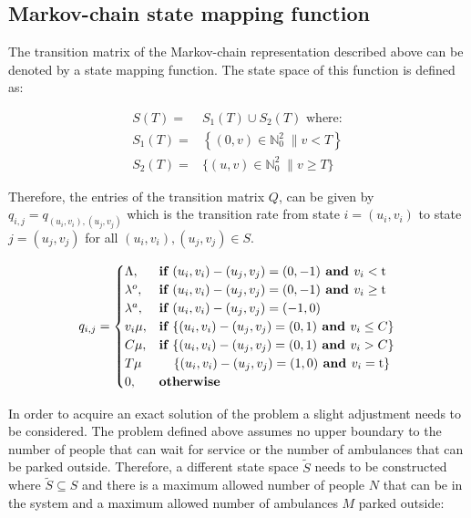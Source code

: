 \documentclass{article}
\begin{document}
\subsection{Markov-chain state mapping function}
The transition matrix of the Markov-chain representation described above can be denoted by a state mapping function. The state space of this function is defined as:



\begin{align}
    S(T) =& S_1(T) \cup S_2(T) \text{ where:} \nonumber \\
    S_1(T) =& \left\{(0, v)\in\mathbb{N}_0^2 \; \| v < T \right\} \\
    S_2(T) =& \{(u, v)\in\mathbb{N}_0^2 \; \| v \geq T \} \nonumber
\end{align}

Therefore, the entries of the transition matrix $Q$, can be given by $q_{i,j} = q_{(u_i, v_i),(u_j, v_j)}$ which is the transition rate from state $i = (u_i, v_i)$ to state $j = (u_j , v_j)$ for all $(u_i, v_i), (u_j, v_j) \in S$.

\begin{equation}
    q_{i, j} = 
    \begin{cases}
        \Lambda, & \textbf{if } (u_i,v_i) - (u_j, v_j) = (0,-1) \textbf{ and } v_i < \text{t} \\
        \lambda^o, & \textbf{if } (u_i,v_i) - (u_j, v_j) = (0,-1) \textbf{ and } v_i \geq \text{t} \\
        \lambda^a, & \textbf{if } (u_i,v_i) - (u_j, v_j) = (-1,0) \\
        v_i \mu, & \textbf{if } \{ (u_i,v_i) - (u_j, v_j) = (0,1) \textbf{ and } v_i \leq C\}\\
        C \mu, & \textbf{if } \{ (u_i,v_i) - (u_j, v_j) = (0,1) \textbf{ and } v_i > C\} \\
        T \mu & \hspace{0.4cm} \{(u_i,v_i) - (u_j, v_j) = (1,0) \textbf{ and } v_i = \text{t}\} \\
        0, & \textbf{otherwise}
    \end{cases}
\end{equation}

In order to acquire an exact solution of the problem a slight adjustment needs to be considered. The problem defined above assumes no upper boundary to the number of people that can wait for service or the number of ambulances that can be parked outside. Therefore, a different state space $\tilde S$ needs to be constructed where $\tilde S \subseteq S $ and there is a maximum allowed number of people $N$ that can be in the system and a maximum allowed number of ambulances $M$ parked outside:
\end{document}
